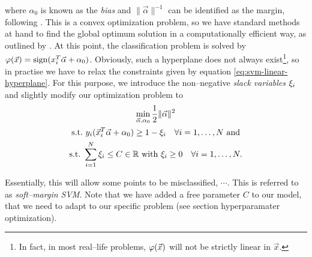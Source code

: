 where $\alpha_0$ is known as the \emph{bias} and $\|\vec \alpha \|^{-1}$ can be identified as the margin, following \citet{hastie2001}. This is a convex optimization problem, so we have standard methods at hand to find the global optimum solution in a computationally efficient way, as outlined by \citet{vanderplas2015}. At this point, the classification problem is solved by $\varphi(\vec x) = \operatorname{sign}(x_i^T \vec \alpha + \alpha_0)$. Obviously, such a hyperplane does not always exist\footnote{In fact, in most real--life problems, $\varphi(\vec x)$ will not be strictly linear in $\vec x$.}, so in practise we have to relax the constraints given by equation \eqref{eq:svm-linear-hyperplane}. For this purpose, we introduce the non--negative \emph{slack variables} $\xi_i$ and slightly modify our optimization problem to \\


\begin{gather}
\label{eq:svm-linear-hyperplane-relaxed}
\min_{\vec \alpha, \alpha_0} \frac{1}{2} \| \vec \alpha \|^2 \\
\text{\st} y_i (\vec x_i^T \vec \alpha + \alpha_0) \ge 1 - \slack_i \quad \forall i = 1, \ldots, N \text{\ and} \\
\text{\st} \sum\limits_{i=1}^{N} \slack_i \le C \in \mathbb{R} \text{\ with\ } \slack_i \ge 0 \quad \forall i = 1, \ldots, N.
\end{gather}


Essentially, this will allow some points to be misclassified, $\cdots$. This is referred to as \emph{soft--margin SVM}. Note that we have added a free parameter $C$ to our model, that we need to adapt to our specific problem (see section hyperparamater optimization).\\


